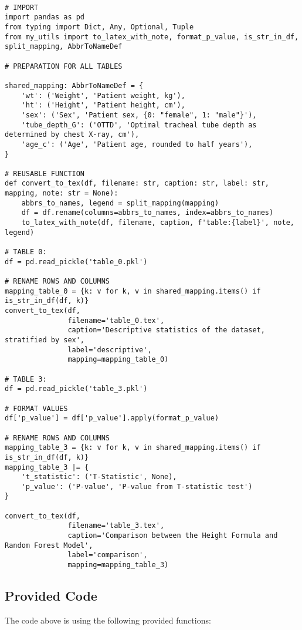 \documentclass[11pt]{article}
\begin{document}
\begin{verbatim}

# IMPORT
import pandas as pd
from typing import Dict, Any, Optional, Tuple
from my_utils import to_latex_with_note, format_p_value, is_str_in_df, split_mapping, AbbrToNameDef

# PREPARATION FOR ALL TABLES

shared_mapping: AbbrToNameDef = {
    'wt': ('Weight', 'Patient weight, kg'),
    'ht': ('Height', 'Patient height, cm'),
    'sex': ('Sex', 'Patient sex, {0: "female", 1: "male"}'),
    'tube_depth_G': ('OTTD', 'Optimal tracheal tube depth as determined by chest X-ray, cm'),
    'age_c': ('Age', 'Patient age, rounded to half years'),
}

# REUSABLE FUNCTION
def convert_to_tex(df, filename: str, caption: str, label: str, mapping, note: str = None):
    abbrs_to_names, legend = split_mapping(mapping)
    df = df.rename(columns=abbrs_to_names, index=abbrs_to_names)
    to_latex_with_note(df, filename, caption, f'table:{label}', note, legend)

# TABLE 0:
df = pd.read_pickle('table_0.pkl')

# RENAME ROWS AND COLUMNS
mapping_table_0 = {k: v for k, v in shared_mapping.items() if is_str_in_df(df, k)} 
convert_to_tex(df, 
               filename='table_0.tex', 
               caption='Descriptive statistics of the dataset, stratified by sex', 
               label='descriptive', 
               mapping=mapping_table_0)

# TABLE 3:
df = pd.read_pickle('table_3.pkl')

# FORMAT VALUES
df['p_value'] = df['p_value'].apply(format_p_value)

# RENAME ROWS AND COLUMNS
mapping_table_3 = {k: v for k, v in shared_mapping.items() if is_str_in_df(df, k)} 
mapping_table_3 |= {
    't_statistic': ('T-Statistic', None),
    'p_value': ('P-value', 'P-value from T-statistic test')
}

convert_to_tex(df, 
               filename='table_3.tex', 
               caption='Comparison between the Height Formula and Random Forest Model', 
               label='comparison', 
               mapping=mapping_table_3)

\end{verbatim}

\subsection{Provided Code}
The code above is using the following provided functions:
\end{document}
